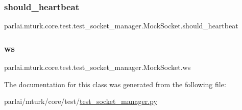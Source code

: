 \subsubsection{\texorpdfstring{should\+\_\+heartbeat}{should\_heartbeat}}
{\footnotesize\ttfamily parlai.\+mturk.\+core.\+test.\+test\+\_\+socket\+\_\+manager.\+Mock\+Socket.\+should\+\_\+heartbeat}

\mbox{\label{classparlai_1_1mturk_1_1core_1_1test_1_1test__socket__manager_1_1MockSocket_ae2988bb7b53c335c9bdda34f592ae40c}} 
\subsubsection{\texorpdfstring{ws}{ws}}
{\footnotesize\ttfamily parlai.\+mturk.\+core.\+test.\+test\+\_\+socket\+\_\+manager.\+Mock\+Socket.\+ws}



The documentation for this class was generated from the following file\+:\begin{DoxyCompactItemize}
\item 
parlai/mturk/core/test/\hyperlink{test_2test__socket__manager_8py}{test\+\_\+socket\+\_\+manager.\+py}\end{DoxyCompactItemize}

